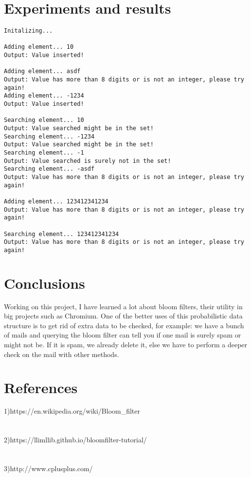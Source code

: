 \documentclass[14pt]{article}
\begin{document}
\section*{Experiments and results}
\begin{lstlisting}
Initalizing... 

Adding element... 10
Output: Value inserted!

Adding element... asdf
Output: Value has more than 8 digits or is not an integer, please try again!
Adding element... -1234
Output: Value inserted!

Searching element... 10 
Output: Value searched might be in the set!
Searching element... -1234
Output: Value searched might be in the set!
Searching element... -1
Output: Value searched is surely not in the set!
Searching element... -asdf
Output: Value has more than 8 digits or is not an integer, please try again!

Adding element... 123412341234
Output: Value has more than 8 digits or is not an integer, please try again!

Searching element... 123412341234
Output: Value has more than 8 digits or is not an integer, please try again!

\end{lstlisting}


\newpage
\section*{Conclusions}
\vspace{20 mm}
Working on this project, I have learned a lot about bloom filters, their utility in big projects such as Chromium. One of the better uses of this probabilistic data structure is to get rid of extra data to be checked, for example: we have a bunch of mails and querying the bloom filter can tell you if one mail is surely spam or might not be. If it is spam, we already delete it, else we have to perform a deeper check on the mail with other methods.
\\\vspace{20mm}
\section*{References}
\large 1)https://en.wikipedia.org/wiki/Bloom\_filter
\\
\\\vspace{6mm}
\\
2)https://llimllib.github.io/bloomfilter-tutorial/
\\
\\\vspace{6mm}
\\
3)http://www.cplusplus.com/
\\
\end{document}

